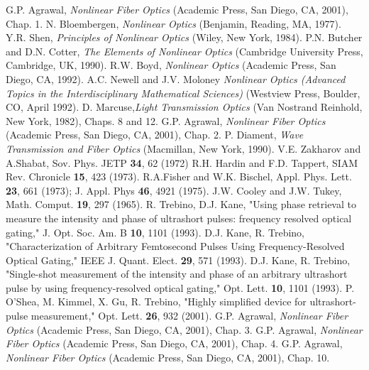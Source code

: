 \begin{thebibliography}{99}
\setlength{\parskip}{1em}

 G.P. Agrawal, {\em Nonlinear Fiber Optics} (Academic
Press, San Diego, CA, 2001), Chap. 1.
 N. Bloembergen, {\em Nonlinear Optics} (Benjamin,
Reading, MA, 1977).
 Y.R. Shen, {\em Principles of Nonlinear Optics} (Wiley, New
York, 1984).
 P.N. Butcher and D.N. Cotter, {\em The Elements of
Nonlinear Optics} (Cambridge University Press, Cambridge, UK, 1990).
 R.W. Boyd, {\em Nonlinear Optics} (Academic Press, San Diego,
CA, 1992).
 A.C. Newell and J.V. Moloney {\em Nonlinear Optics (Advanced Topics in the Interdisciplinary Mathematical Sciences)} (Westview Press, Boulder, CO, April 1992).
 D. Marcuse,{\em Light Transmission Optics} (Van Nostrand
Reinhold, New York, 1982), Chaps. 8 and 12.
 G.P. Agrawal, {\em Nonlinear Fiber Optics} (Academic
Press, San Diego, CA, 2001), Chap. 2.
 P. Diament, {\em Wave Transmission and Fiber Optics}
(Macmillan, New York, 1990).
 V.E. Zakharov and A.Shabat, Sov. Phys. JETP
\textbf{34}, 62 (1972)
 R.H. Hardin and F.D. Tappert, SIAM
Rev. Chronicle \textbf{15}, 423 (1973).
 R.A.Fisher and
W.K. Bischel, Appl. Phys. Lett. \textbf{23}, 661 (1973); J. Appl. Phys
\textbf{46}, 4921 (1975).
 J.W. Cooley and J.W. Tukey,
Math. Comput. \textbf{19}, 297 (1965).
 R. Trebino, D.J. Kane, "Using phase retrieval to measure
the intensity and phase of ultrashort pulses: frequency resolved optical gating," J. Opt. Soc. Am. B \textbf{10}, 1101 (1993).
 D.J. Kane, R. Trebino, "Characterization of Arbitrary Femtosecond Pulses Using Frequency-Resolved Optical Gating," IEEE J. Quant. Elect. \textbf{29}, 571 (1993).
 D.J. Kane, R. Trebino, "Single-shot measurement of the intensity and phase of an arbitrary ultrashort pulse  by using frequency-resolved optical gating," Opt. Lett. \textbf{10}, 1101 (1993).
P. O'Shea, M. Kimmel, X. Gu, R. Trebino, "Highly simplified device for ultrashort-pulse measurement," Opt. Lett. \textbf{26}, 932 (2001).
 G.P. Agrawal, {\em Nonlinear Fiber Optics} (Academic
Press, San Diego, CA, 2001), Chap. 3.
 G.P. Agrawal, {\em Nonlinear Fiber Optics} (Academic
Press, San Diego, CA, 2001), Chap. 4.
 G.P. Agrawal, {\em Nonlinear Fiber Optics} (Academic
Press, San Diego, CA, 2001), Chap. 10.

\end{thebibliography}
